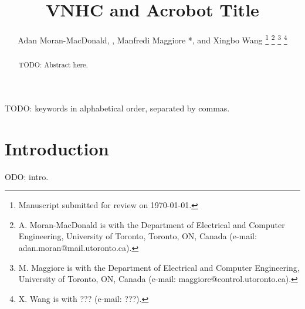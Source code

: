 \documentclass[journal,twoside,web]{ieeecolor}
\newcommand*{\Title}{VNHC and Acrobot Title}
\begin{document}
\title{\Title}
\author{Adan Moran-MacDonald, , Manfredi Maggiore
*, and Xingbo Wang
\thanks{Manuscript submitted for review on \today.}
\thanks{A. Moran-MacDonald is with the Department of Electrical and Computer
    Engineering, University of Toronto, Toronto, ON, Canada (e-mail:
adan.moran@mail.utoronto.ca).}
\thanks{M. Maggiore is with the Department of Electrical and Computer
Engineering, University of Toronto, ON, Canada (e-mail:
maggiore@control.utoronto.ca).}
\thanks{X. Wang is with ??? (e-mail: ???).}
} %

\maketitle

\begin{abstract}
TODO: Abstract here.
\end{abstract}

\begin{IEEEkeywords}
TODO: keywords in alphabetical order, separated by commas.
\end{IEEEkeywords}

\section{Introduction}\label{sec:introduction}
ODO: intro.
\end{document}
